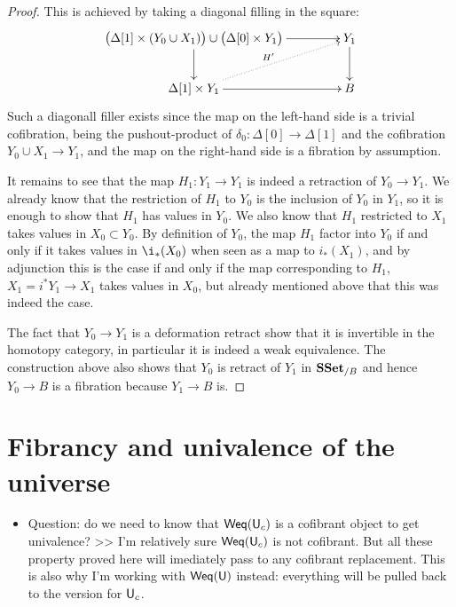 \documentclass[reqno,10pt,a4paper,oneside,draft]{amsart}
\begin{document}
\begin{proof}
This is achieved by taking a diagonal filling in the square:
\[
\xymatrix@C=1.5cm{
\big( \Delta[1] \times (Y_0 \cup X_1) \big)  \cup \big( \Delta[0] \times Y_1 \big) \ar[d] \ar[r] & Y_1 \ar[d] \\
\Delta[1] \times Y_1 \ar[r] \ar@{.>}[ur]^{H'} & B
}\]
Such a diagonall filler exists since the map on the left-hand side is a trivial cofibration, being the 
 pushout-product of $\delta_0 : \Delta[0] \rightarrow \Delta[1]$ and the cofibration $Y_0 \cup X_1 \rightarrow Y_1$, and the map on the right-hand side is a fibration by assumption.

It remains to see that the map $H_{1}:Y_1 \rightarrow Y_1$ is indeed a retraction of $Y_0 \rightarrow Y_1$. We already know that the restriction of $H_{1}$ to $Y_0$ is  the inclusion of $Y_0$ in $Y_1$, so it is enough to show that $H_{1}$ has values in $Y_0$. We also know that $H_{1}$ restricted to $X_1$ takes values in $X_0 \subset Y_0$. By definition of $Y_0$, the map $H_1$ factor into $Y_0$ if and only if it takes values in $\i_*(X_0)$ when seen as a map to $i_*(X_1)$, and by adjunction this is the case if and only if the map corresponding to $H_1$, $X_1=i^* Y_1 \rightarrow X_1$ takes values in $X_0$, but already mentioned above that this was indeed the case.

The fact that $Y_0 \rightarrow Y_1$ is a deformation retract show that it is invertible in the homotopy category, in particular it is indeed a weak equivalence. The construction above also shows that $Y_0$ is retract of $Y_1$ in $\mathbf{SSet}_{/B}$ and hence $Y_0 \rightarrow B$ is a fibration because $Y_1 \rightarrow B$ is.
\end{proof}

\newpage

\section{Fibrancy and univalence of the universe}
\label{sec:fibuu}


\begin{itemize}
\item Question: do we need to know that $\mathsf{Weq}(\mathsf{U}_c)$ is a cofibrant object to get univalence? >> I'm relatively sure $\mathsf{Weq}(\mathsf{U}_c)$ is not cofibrant. But all these property proved here will imediately pass to any cofibrant replacement. This is also why I'm working with  $\mathsf{Weq}(\mathsf{U})$ instead: everything will be pulled back to the version for $\mathsf{U}_c$.
\end{itemize}
\end{document}
